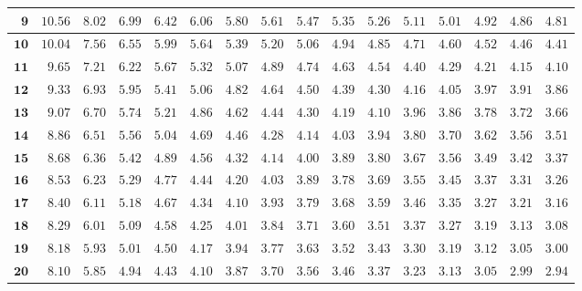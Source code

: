 \begin{alternateColorTable}
\begin{longtable}{|r|r|r|r|r|r|r|r|r|r|r|r|r|r|r|r|}
    \(\mathbf{9}\) & \(10.56\) & \(8.02\) & \(6.99\) & \(6.42\) & \(6.06\) & \(5.80\) & \(5.61\) & \(5.47\) & \(5.35\) & \(5.26\) & \(5.11\) & \(5.01\) & \(4.92\) & \(4.86\) & \(4.81\) \\ \hline 
    \(\mathbf{10}\) & \(10.04\) & \(7.56\) & \(6.55\) & \(5.99\) & \(5.64\) & \(5.39\) & \(5.20\) & \(5.06\) & \(4.94\) & \(4.85\) & \(4.71\) & \(4.60\) & \(4.52\) & \(4.46\) & \(4.41\) \\ \hline 
    \(\mathbf{11}\) & \(9.65\) & \(7.21\) & \(6.22\) & \(5.67\) & \(5.32\) & \(5.07\) & \(4.89\) & \(4.74\) & \(4.63\) & \(4.54\) & \(4.40\) & \(4.29\) & \(4.21\) & \(4.15\) & \(4.10\) \\ \hline 
    \(\mathbf{12}\) & \(9.33\) & \(6.93\) & \(5.95\) & \(5.41\) & \(5.06\) & \(4.82\) & \(4.64\) & \(4.50\) & \(4.39\) & \(4.30\) & \(4.16\) & \(4.05\) & \(3.97\) & \(3.91\) & \(3.86\) \\ \hline 
    \(\mathbf{13}\) & \(9.07\) & \(6.70\) & \(5.74\) & \(5.21\) & \(4.86\) & \(4.62\) & \(4.44\) & \(4.30\) & \(4.19\) & \(4.10\) & \(3.96\) & \(3.86\) & \(3.78\) & \(3.72\) & \(3.66\) \\ \hline 
    \(\mathbf{14}\) & \(8.86\) & \(6.51\) & \(5.56\) & \(5.04\) & \(4.69\) & \(4.46\) & \(4.28\) & \(4.14\) & \(4.03\) & \(3.94\) & \(3.80\) & \(3.70\) & \(3.62\) & \(3.56\) & \(3.51\) \\ \hline 
    \(\mathbf{15}\) & \(8.68\) & \(6.36\) & \(5.42\) & \(4.89\) & \(4.56\) & \(4.32\) & \(4.14\) & \(4.00\) & \(3.89\) & \(3.80\) & \(3.67\) & \(3.56\) & \(3.49\) & \(3.42\) & \(3.37\) \\ \hline 
    \(\mathbf{16}\) & \(8.53\) & \(6.23\) & \(5.29\) & \(4.77\) & \(4.44\) & \(4.20\) & \(4.03\) & \(3.89\) & \(3.78\) & \(3.69\) & \(3.55\) & \(3.45\) & \(3.37\) & \(3.31\) & \(3.26\) \\ \hline 
    \(\mathbf{17}\) & \(8.40\) & \(6.11\) & \(5.18\) & \(4.67\) & \(4.34\) & \(4.10\) & \(3.93\) & \(3.79\) & \(3.68\) & \(3.59\) & \(3.46\) & \(3.35\) & \(3.27\) & \(3.21\) & \(3.16\) \\ \hline 
    \(\mathbf{18}\) & \(8.29\) & \(6.01\) & \(5.09\) & \(4.58\) & \(4.25\) & \(4.01\) & \(3.84\) & \(3.71\) & \(3.60\) & \(3.51\) & \(3.37\) & \(3.27\) & \(3.19\) & \(3.13\) & \(3.08\) \\ \hline 
    \(\mathbf{19}\) & \(8.18\) & \(5.93\) & \(5.01\) & \(4.50\) & \(4.17\) & \(3.94\) & \(3.77\) & \(3.63\) & \(3.52\) & \(3.43\) & \(3.30\) & \(3.19\) & \(3.12\) & \(3.05\) & \(3.00\) \\ \hline 
    \(\mathbf{20}\) & \(8.10\) & \(5.85\) & \(4.94\) & \(4.43\) & \(4.10\) & \(3.87\) & \(3.70\) & \(3.56\) & \(3.46\) & \(3.37\) & \(3.23\) & \(3.13\) & \(3.05\) & \(2.99\) & \(2.94\) \\ \hline 

\end{longtable}
\end{alternateColorTable}
